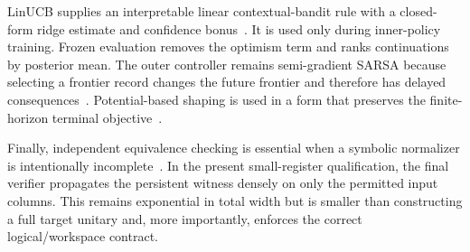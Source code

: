 LinUCB supplies an interpretable linear contextual-bandit rule with a closed-form ridge estimate and confidence bonus~\cite{li2010contextual,abbasiyadkori2011improved}. It is used only during inner-policy training. Frozen evaluation removes the optimism term and ranks continuations by posterior mean. The outer controller remains semi-gradient SARSA because selecting a frontier record changes the future frontier and therefore has delayed consequences~\cite{sutton2018rl}. Potential-based shaping is used in a form that preserves the finite-horizon terminal objective~\cite{ng1999policy}.

Finally, independent equivalence checking is essential when a symbolic normalizer is intentionally incomplete~\cite{burgholzer2020advanced}. In the present small-register qualification, the final verifier propagates the persistent witness densely on only the permitted input columns. This remains exponential in total width but is smaller than constructing a full target unitary and, more importantly, enforces the correct logical/workspace contract.
